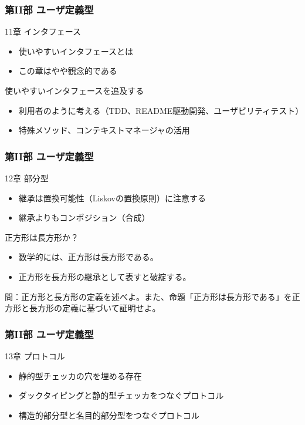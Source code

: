 \documentclass[aspectratio=169,dvipdfmx,14pt,notheorems]{beamer}
\theoremstyle{definition}
\begin{document}
\begin{frame}\frametitle{第II部 ユーザ定義型}

\begin{block}{11章 インタフェース}
\begin{itemize}
\item 使いやすいインタフェースとは
\item この章はやや観念的である
\end{itemize}
\end{block}

\begin{exampleblock}{使いやすいインタフェースを追及する}
\begin{itemize}
\item 利用者のように考える（TDD、README駆動開発、ユーザビリティテスト）
\item 特殊メソッド、コンテキストマネージャの活用
\end{itemize}
\end{exampleblock}

\end{frame}

\begin{frame}\frametitle{第II部 ユーザ定義型}

\begin{block}{12章 部分型}
\begin{itemize}
\item 継承は置換可能性（Liskovの置換原則）に注意する
\item 継承よりもコンポジション（合成）
\end{itemize}
\end{block}

\begin{alertblock}{正方形は長方形か？}
\begin{itemize}
\item 数学的には、正方形は長方形である。
\item 正方形を長方形の継承として表すと破綻する。
\end{itemize}
\end{alertblock}
問：正方形と長方形の定義を述べよ。また、命題「正方形は長方形である」を正方形と長方形の定義に基づいて証明せよ。
\end{frame}

\begin{frame}\frametitle{第II部 ユーザ定義型}

\begin{block}{13章 プロトコル}
\begin{itemize}
\item 静的型チェッカの穴を埋める存在
\item ダックタイピングと静的型チェッカをつなぐプロトコル
\item 構造的部分型と名目的部分型をつなぐプロトコル
\end{itemize}
\end{block}

\end{frame}
\end{document}
